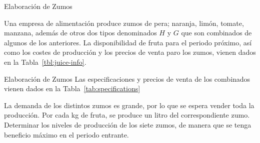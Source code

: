 \documentclass[../../main.tex]{subfiles}
\begin{document}
\begin{frame}{Elaboración de Zumos}{}

  Una empresa de alimentación produce zumos de pera; naranja, limón, tomate, manzana, además de otros dos tipos denominados $H$ y $G$ que son combinados de algunos de los anteriores. La disponibilidad de fruta para el periodo próximo, así como los costes de producción y los precios de venta paro los zumos, vienen dados en la Tabla~\ref{tbl:juice-info}.
            \begin{table}[!ht]
        \caption{\label{tbl:juice-info}Información para elaboración de zumos.}
    \centering
    \end{table}
    
    
  \end{frame}
  
  \begin{frame}{Elaboración de Zumos}{}
    Las especificaciones y precios de venta de los combinados vienen dados en la Tabla~\ref{tab:specifications}
    
          \begin{table}
    \caption{\label{tab:specifications}Especificación de zumos combinados.}
    \centering
  \end{table}

      La demanda de los distintos zumos es grande, por lo que se espera vender toda la producción. Por cada kg de fruta, se produce un litro del correspondiente zumo. Determinar los niveles de producción de los siete zumos, de manera que se tenga beneficio máximo en el periodo entrante.%
\end{frame}
\end{document}
